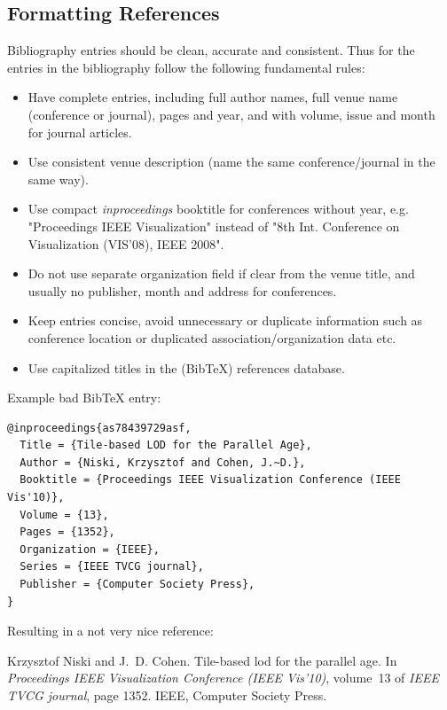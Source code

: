\documentclass[11pt, a4paper,oneside,chapterprefix=false]{scrbook}
\begin{document}
\subsection{Formatting References}

Bibliography entries should be clean, accurate and consistent. Thus for the entries in the bibliography follow the following fundamental rules:

\begin{itemize}
\item Have complete entries, including full author names, full venue name (conference or journal), pages and year, and with volume, issue and month for journal articles.
\item Use consistent venue description (name the same conference/journal in the same way).
\item Use compact {\em inproceedings} booktitle for conferences without year, e.g. "Proceedings IEEE Visualization" instead of "8th Int. Conference on Visualization (VIS'08), IEEE 2008".
\item Do not use separate organization field if clear from the venue title, and usually no publisher, month and address for conferences.
\item Keep entries concise, avoid unnecessary or duplicate information such as conference location or duplicated association/organization data etc.
\item Use capitalized titles in the (BibTeX) references database.
\end{itemize}

\noindent
Example bad BibTeX entry:

\begin{verbatim}
@inproceedings{as78439729asf,
  Title = {Tile-based LOD for the Parallel Age},
  Author = {Niski, Krzysztof and Cohen, J.~D.},
  Booktitle = {Proceedings IEEE Visualization Conference (IEEE Vis'10)},
  Volume = {13},
  Pages = {1352},
  Organization = {IEEE},
  Series = {IEEE TVCG journal},
  Publisher = {Computer Society Press},
}
\end{verbatim}

\noindent
Resulting in a not very nice reference:

\smallskip
\noindent
[NC]  Krzysztof Niski and J. D. Cohen. Tile-based lod for the parallel age. In {\em Proceedings IEEE Visualization Conference (IEEE Vis’10)}, volume 13 of {\em IEEE TVCG journal}, page 1352. IEEE, Computer Society Press.
\end{document}
